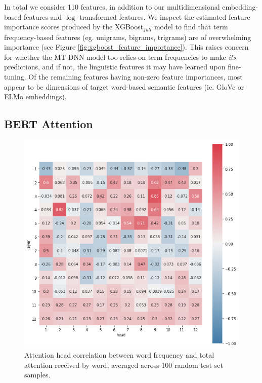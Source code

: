 \documentclass[11pt,a4paper]{article}
\begin{document}
In total we consider 110 features, in addition to our multidimensional embedding-based features and $\log$-transformed features. We inspect the estimated feature importance scores produced by the XGBoost$_\textit{full}$ model to find that term frequency-based features (eg. unigrams, bigrams, trigrams) are of overwhelming importance (see Figure \ref{fig:xgboost_feature_importance}). This raises concern for whether the MT-DNN model too relies on term frequencies to make \textit{its} predictions, and if not, the linguistic features it may have learned upon fine-tuning. Of the remaining features having non-zero feature importances, most appear to be dimensions of target word-based semantic features (ie. GloVe or ELMo embeddings).

\subsection{BERT Attention}
\label{sec:bert_attention}

\begin{figure}
  \centering
  \includegraphics[scale=0.37]{head_correlations_tf.png}
  \captionsetup{justification=centering}
  \caption{\label{fig:head_correlations_tf} Attention head correlation between word frequency and total attention received by word, averaged across 100 random test set samples.}
\end{figure}
\end{document}
